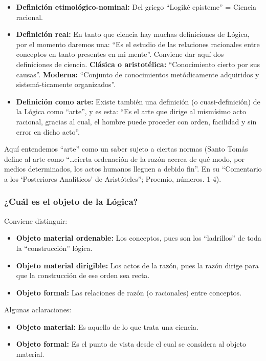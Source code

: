 \documentclass{article}
\begin{document}
\begin{itemize}
    \item[] \textbf{Definición etimológico-nominal:} Del griego ``Logiké episteme'' = Ciencia racional.
    \item[] \textbf{Definición real:} En tanto que ciencia hay muchas definiciones de Lógica, por el momento daremos una: ``Es el estudio de las relaciones racionales entre conceptos en tanto presentes en mi mente''. 
        Conviene dar aquí dos definiciones de ciencia.
        \subitem \textbf{Clásica o aristotélica:} ``Conocimiento cierto por sus causas''.
        \subitem \textbf{Moderna:} ``Conjunto de conocimientos metódicamente adquiridos y sistemá-ticamente organizados''.
    \item[] \textbf{Definición como arte:} Existe también una definición (o cuasi-definición) de la Lógica como ``arte'', y es esta: ``Es el arte que dirige al mismísimo acto racional, gracias al cual, el hombre puede proceder con orden, facilidad y sin error en dicho acto''. 
\end{itemize}

    Aquí entendemos ``arte'' como un saber sujeto a ciertas normas (Santo Tomás define al arte como ``\ldots cierta ordenación de la razón acerca de qué modo, por medios determinados, los actos humanos lleguen a debido fin''. En su ``Comentario a los `Posteriores Analíticos' de Aristóteles''; Proemio, números. 1-4).

\subsubsection{¿Cuál es el objeto de la Lógica?}
    Conviene distinguir:
\begin{itemize}[noitemsep,nolistsep]
    \item[] \textbf{Objeto material ordenable:} Los conceptos, pues son los ``ladrillos'' de toda la ``construcción'' lógica.
    \item[] \textbf{Objeto material dirigible:} Los actos de la razón, pues la razón dirige para que la construcción de ese orden sea recta.
    \item[] \textbf{Objeto formal:} Las relaciones de razón (o racionales) entre conceptos.
\end{itemize}
    
    Algunas aclaraciones:
\begin{itemize}[noitemsep,nolistsep]
    \item[] \textbf{Objeto material:} Es aquello de lo que trata una ciencia.
    \item[] \textbf{Objeto formal:} Es el punto de vista desde el cual se considera al objeto material.
\end{itemize}
\end{document}
